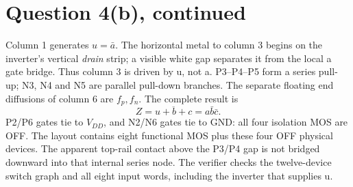 \documentclass[10pt]{article}
\begin{document}
\section*{Question 4(b), continued}
Column 1 generates $u=\bar a$. The horizontal metal to column 3 begins on the inverter's vertical \emph{drain} strip; a visible white gap separates it from the local a gate bridge. Thus column 3 is driven by u, not a. P3--P4--P5 form a series pull-up; N3, N4 and N5 are parallel pull-down branches. The separate floating end diffusions of column 6 are $f_p,f_n$. The complete result is
\[\boxed{Z=\overline{u+b+c}=a\bar b\bar c.}\]
P2/P6 gates tie to $V_{DD}$, and N2/N6 gates tie to GND: all four isolation MOS are OFF. The layout contains eight functional MOS plus these four OFF physical devices. The apparent top-rail contact above the P3/P4 gap is not bridged downward into that internal series node. The verifier checks the twelve-device switch graph and all eight input words, including the inverter that supplies u.
\end{document}
